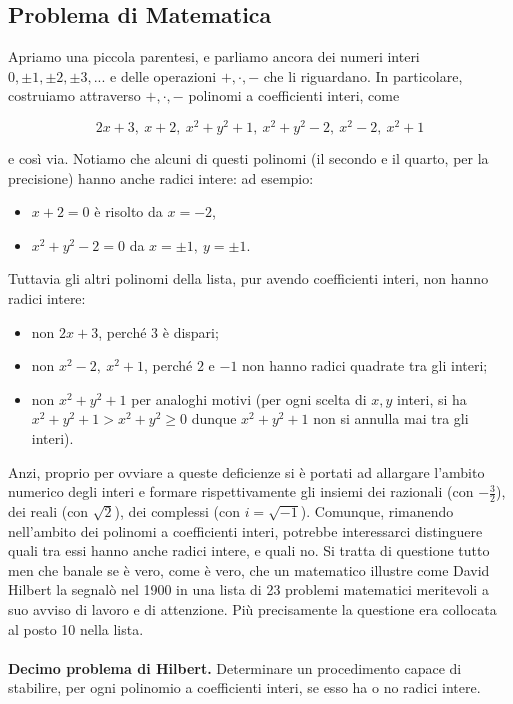 \subsection{Problema di Matematica}

Apriamo una piccola parentesi, e parliamo ancora dei numeri interi
$0, \pm 1, \pm 2, \pm 3, ...$
e delle operazioni $+, \cdot, -$ che li riguardano. In particolare, costruiamo
attraverso $+, \cdot, -$ polinomi a coefficienti interi, come

\[
    2x + 3, \ x + 2, \ x^{2} + y^{2} + 1, \ x^{2} + y^{2} - 2, \
    x^{2} - 2, \ x^{2} + 1
\]

e così via. Notiamo che alcuni di questi polinomi (il secondo e il quarto, per la
precisione) hanno anche radici intere: ad esempio:

\begin{itemize}
    \item $x + 2 = 0$ è risolto da $x = -2$,
    \item $x^{2} + y^{2} - 2 = 0$ da $x = \pm 1, \ y = \pm 1$.
\end{itemize}

Tuttavia gli altri polinomi della lista, pur avendo coefficienti interi, non hanno
radici intere:

\begin{itemize}
    \item non $2x + 3$, perché $3$ è dispari;
    \item non $x^{2} - 2, \ x^{2} + 1$, perché $2$ e $-1$ non hanno radici quadrate tra gli interi;
    \item non $x^{2} + y^{2} + 1$ per analoghi motivi (per ogni scelta di $x, y$ interi, si ha $x^{2} +
              y^{2} + 1 > x^{2} + y{^2} \geq 0$ dunque $x^{2} + y{^2} + 1$ non si annulla mai tra gli interi).
\end{itemize}

Anzi, proprio per ovviare a queste deficienze si è portati ad allargare l'ambito
numerico degli interi e formare rispettivamente gli insiemi dei razionali (con $- \frac{3}{2}$),
dei reali (con $\sqrt{2}$), dei complessi (con $i = \sqrt{-1}$).
Comunque, rimanendo nell'ambito dei polinomi a coefficienti interi, potrebbe interessarci distinguere
quali tra essi hanno anche radici intere, e quali no. Si tratta di questione tutto men che banale se
è vero, come è vero, che un matematico illustre come David Hilbert la segnalò nel 1900 in una lista di
23 problemi matematici meritevoli a suo avviso di lavoro e di attenzione.
Più precisamente la questione era collocata al posto 10 nella lista.\\
\ \\
\textbf{Decimo problema di Hilbert.} Determinare un procedimento capace di stabilire,
per ogni polinomio a coefficienti interi, se esso ha o no radici intere.

